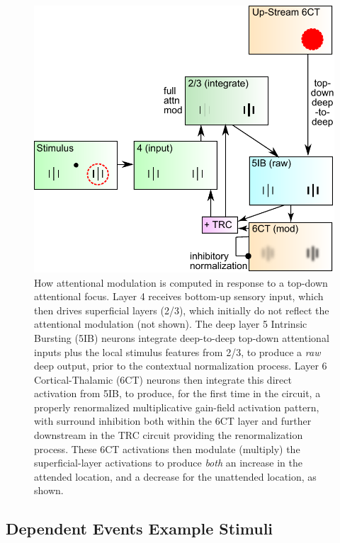 \documentclass[11pt, titlepage, twoside]{article}
\begin{document}
\begin{figure}
  \centering\includegraphics[width=.75\textwidth]{figs/fig_deepleabra_attn_compute.pdf}
  \caption[Signal Flow Through Cortical Layers in Deep LEABRA]{\small How attentional modulation is computed in response to a top-down attentional focus.  Layer 4 receives bottom-up sensory input, which then drives superficial layers (2/3), which initially do not reflect the attentional modulation (not shown).  The deep layer 5 Intrinsic Bursting (5IB) neurons integrate deep-to-deep top-down attentional inputs plus the local stimulus features from 2/3, to produce a {\em raw} deep output, prior to the contextual normalization process.  Layer 6 Cortical-Thalamic (6CT) neurons then integrate this direct activation from 5IB, to produce, for the first time in the circuit, a properly renormalized multiplicative gain-field activation pattern, with surround inhibition both within the 6CT layer and further downstream in the  TRC circuit providing the renormalization process.  These 6CT activations then modulate (multiply) the superficial-layer activations to produce {\em both} an increase in the attended location, and a decrease for the unattended location, as shown.  
  }
  \label{fig:attn_compute}
\end{figure}

\subsection{Dependent Events Example Stimuli}
\label{appStimuli}
\end{document}
